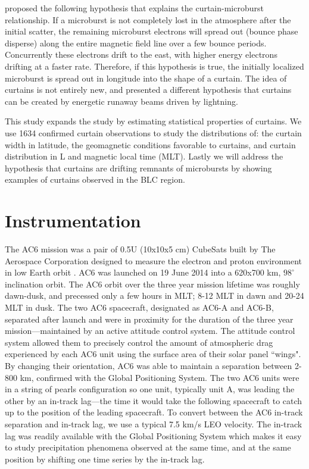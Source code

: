 \documentclass[draft]{agujournal2019}
\begin{document}
 proposed the following hypothesis that explains the curtain-microburst relationship. If a microburst is not completely lost in the atmosphere after the initial scatter, the remaining microburst electrons will spread out (bounce phase disperse) along the entire magnetic field line over a few bounce periods. Concurrently these electrons drift to the east, with higher energy electrons drifting at a faster rate. Therefore, if this hypothesis is true, the initially localized microburst is spread out in longitude into the shape of a curtain. The idea of curtains is not entirely new, and  presented a different hypothesis that curtains can be created by energetic runaway beams driven by lightning.

This study expands the  study by estimating statistical properties of curtains. We use 1634 confirmed curtain observations to study the distributions of: the curtain width in latitude, the geomagnetic conditions favorable to curtains, and curtain distribution in L and magnetic local time (MLT). Lastly we will address the hypothesis that curtains are drifting remnants of microbursts by showing examples of curtains observed in the BLC region.

\section{Instrumentation} \label{instrumentation}
The AC6 mission was a pair of 0.5U (10x10x5 cm) CubeSats built by The Aerospace Corporation designed to measure the electron and proton environment in low Earth orbit \cite{O'brien2016}. AC6 was launched on 19 June 2014 into a 620x700 km, $98^\circ$ inclination orbit. The AC6 orbit over the three year mission lifetime was roughly dawn-dusk, and precessed only a few hours in MLT; 8-12 MLT in dawn and 20-24 MLT in dusk. The two AC6 spacecraft, designated as AC6-A and AC6-B, separated after launch and were in proximity for the duration of the three year mission---maintained by an active attitude control system. The attitude control system allowed them to precisely control the amount of atmospheric drag experienced by each AC6 unit using the surface area of their solar panel ``wings". By changing their orientation, AC6 was able to maintain a separation between 2-800 km, confirmed with the Global Positioning System. The two AC6 units were in a string of pearls configuration so one unit, typically unit A, was leading the other by an in-track lag---the time it would take the following spacecraft to catch up to the position of the leading spacecraft. To convert between the AC6 in-track separation and in-track lag, we use a typical 7.5 km/s LEO velocity. The in-track lag was readily available with the Global Positioning System which makes it easy to study precipitation phenomena observed at the same time, and at the same position by shifting one time series by the in-track lag.
\end{document}
